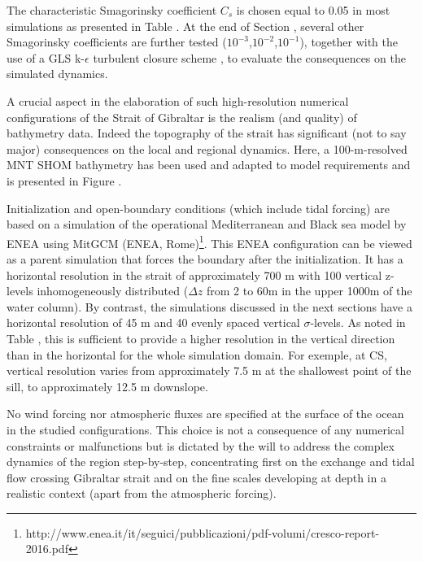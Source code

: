 The characteristic Smagorinsky coefficient $C_s$ is chosen equal to 0.05 in most simulations as presented in Table . At the end of Section , several other Smagorinsky coefficients are further tested  ($10^{-3}$,$10^{-2}$,$10^{-1}$), together with the use of a GLS k-$\epsilon$ turbulent closure scheme \citep{umlauf_2003}, to evaluate the consequences on the simulated dynamics.

A crucial aspect in the elaboration of such high-resolution numerical configurations of the Strait of Gibraltar is the realism (and quality) of bathymetry data. Indeed the topography of the strait has significant (not to say major) consequences on the local and regional dynamics. Here, a 100-m-resolved MNT SHOM bathymetry has been used and adapted to model requirements and is presented in Figure .

Initialization and open-boundary conditions (which include tidal forcing) are based on a simulation of the operational Mediterranean and Black sea model by ENEA using MitGCM (ENEA, Rome)\footnote{http://www.enea.it/it/seguici/pubblicazioni/pdf-volumi/cresco-report-2016.pdf}. This ENEA configuration can be viewed as a parent simulation\color{red} that forces the boundary after the initialization\color{black}. It has a horizontal resolution in the strait of approximately 700 m with 100 vertical z-levels inhomogeneously distributed ($\Delta z$ from 2 to 60m in the upper 1000m of the water column). By contrast, the simulations discussed in the next sections have a horizontal resolution of 45 m and 40 evenly spaced vertical $\sigma$-levels. As noted in Table , this is sufficient to provide a higher resolution in the vertical direction than in the horizontal for the whole simulation domain. For exemple, at CS, vertical resolution varies from approximately 7.5 m at the shallowest point of the sill, to approximately 12.5 m downslope.

No wind forcing nor atmospheric fluxes are specified at the surface of the ocean in the studied configurations. This choice is not a consequence of any numerical constraints or malfunctions but is dictated by the will to address the complex dynamics of the region step-by-step, concentrating first on the exchange and tidal flow crossing Gibraltar strait and on the fine scales developing at depth in a realistic context (apart from the atmospheric forcing).

